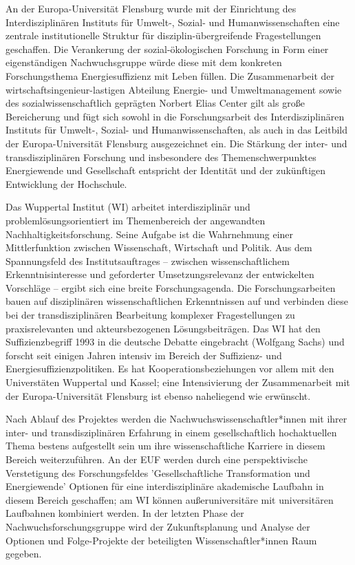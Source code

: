 \documentclass[a4paper,11pt,twoside]{scrartcl}
\begin{document}
An der Europa-Universität Flensburg wurde mit der Einrichtung des Interdisziplinären Instituts für Umwelt-, Sozial- und Humanwissenschaften eine zentrale institutionelle Struktur für disziplin-übergreifende Fragestellungen geschaffen. Die Verankerung der sozial-ökologischen Forschung in Form einer eigenständigen Nachwuchsgruppe würde diese mit dem konkreten Forschungsthema Energiesuffizienz mit Leben füllen. Die Zusammenarbeit der wirtschaftsingenieur-lastigen Abteilung Energie- und Umweltmanagement sowie des sozialwissenschaftlich geprägten Norbert Elias Center gilt als große Bereicherung und fügt sich sowohl in die Forschungsarbeit des Interdisziplinären Instituts für Umwelt-, Sozial- und Humanwissenschaften, als auch in das Leitbild der Europa-Universität Flensburg ausgezeichnet ein. Die Stärkung der inter- und transdisziplinären Forschung und insbesondere des Themenschwerpunktes Energiewende und Gesellschaft entspricht der Identität und der zukünftigen Entwicklung der Hochschule.

Das Wuppertal Institut (WI) arbeitet interdisziplinär und problemlösungsorientiert im Themenbereich der angewandten Nachhaltigkeitsforschung. Seine Aufgabe ist die Wahrnehmung einer Mittlerfunktion zwischen Wissenschaft, Wirtschaft und Politik. Aus dem Spannungsfeld des Institutsauftrages – zwischen wissenschaftlichem Erkenntnisinteresse und geforderter Umsetzungsrelevanz der entwickelten Vorschläge – ergibt sich eine breite Forschungsagenda. Die Forschungsarbeiten bauen auf disziplinären wissenschaftlichen Erkenntnissen auf und verbinden diese bei der transdisziplinären Bearbeitung komplexer Fragestellungen zu praxisrelevanten und akteursbezogenen Lösungsbeiträgen. Das WI hat den Suffizienzbegriff 1993 in die deutsche Debatte eingebracht (Wolfgang Sachs) und forscht seit einigen Jahren intensiv im Bereich der Suffizienz- und Energiesuffizienzpolitiken. Es hat Kooperationsbeziehungen vor allem mit den Universtäten Wuppertal und Kassel; eine Intensivierung der Zusammenarbeit mit der Europa-Universität Flensburg ist ebenso naheliegend wie erwünscht.

Nach Ablauf des Projektes werden die Nachwuchswissenschaftler*innen mit ihrer inter- und transdisziplinären Erfahrung in einem gesellschaftlich hochaktuellen Thema bestens aufgestellt sein um ihre wissenschaftliche Karriere in diesem Bereich weiterzuführen. An der EUF werden durch eine perspektivische Verstetigung des Forschungsfeldes 'Gesellschaftliche Transformation und Energiewende' Optionen für eine interdisziplinäre akademische Laufbahn in diesem Bereich geschaffen; am WI können außeruniversitäre mit universitären Laufbahnen kombiniert werden. In der letzten Phase der Nachwuchsforschungsgruppe wird der Zukunftsplanung und Analyse der Optionen und Folge-Projekte der beteiligten Wissenschaftler*innen Raum gegeben. 
\end{document}
